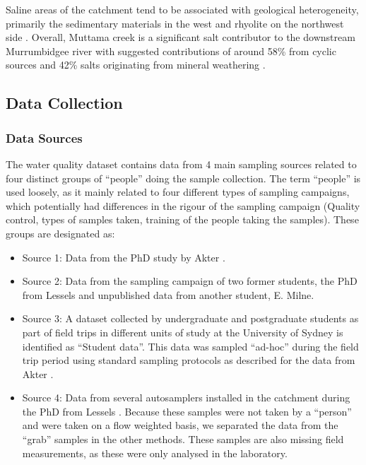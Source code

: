 \documentclass[, manuscript]{copernicus}
\begin{document}
Saline areas of the catchment tend to be associated with geological
heterogeneity, primarily the sedimentary materials in the west and
rhyolite on the northwest side \citep{Conyers2008}. Overall, Muttama
creek is a significant salt contributor to the downstream Murrumbidgee
river with suggested contributions of around 58\% from cyclic sources
and 42\% salts originating from mineral weathering \citep{Conyers2008}.

\subsection{Data Collection}

\subsubsection{Data Sources}

The water quality dataset contains data from 4 main sampling sources
related to four distinct groups of ``people'' doing the sample
collection. The term ``people'' is used loosely, as it mainly related to
four different types of sampling campaigns, which potentially had
differences in the rigour of the sampling campaign (Quality control,
types of samples taken, training of the people taking the samples).
These groups are designated as:

\begin{itemize}
\item
  Source 1: Data from the PhD study by Akter \citeyearpar{Akter2018}.
\item
  Source 2: Data from the sampling campaign of two former students, the
  PhD from Lessels \citeyearpar{Lessels2014} and unpublished data from
  another student, E. Milne.
\item
  Source 3: A dataset collected by undergraduate and postgraduate
  students as part of field trips in different units of study at the
  University of Sydney is identified as ``Student data''. This data was
  sampled ``ad-hoc'' during the field trip period using standard
  sampling protocols as described for the data from Akter
  \citeyearpar{Akter2018}.
\item
  Source 4: Data from several autosamplers installed in the catchment
  during the PhD from Lessels \citeyearpar{Lessels2014}. Because these
  samples were not taken by a ``person'' and were taken on a flow
  weighted basis, we separated the data from the ``grab'' samples in the
  other methods. These samples are also missing field measurements, as
  these were only analysed in the laboratory.
\end{itemize}
\end{document}
